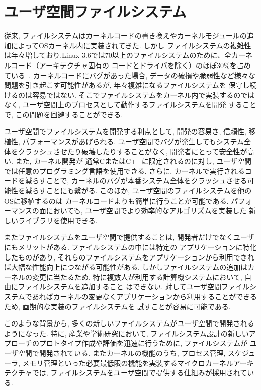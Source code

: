 \documentclass[a4paper,11pt]{jreport}
\begin{document}
\section{ユーザ空間ファイルシステム}
従来, ファイルシステムはカーネルコードの書き換えやカーネルモジュールの追加によってOSカーネル内に実装されてきた. しかし
ファイルシステムの複雑性は年々増しており,Linux 3.6では70以上のファイルシステムのために、全カーネルコード（アーキテクチャ固有の
コードとドライバを除く）のほぼ30\%を占めている~\cite{190583}.
カーネルコードにバグがあった場合, データの破損や脆弱性など様々な問題を引き起こす可能性があるが, 年々複雑になるファイルシステムを
保守し続けるのは容易ではない. 
そこでファイルシステムをカーネル内で実装するのではなく, ユーザ空間上のプロセスとして動作するファイルシステムを開発
することで, この問題を回避することができる. 

ユーザ空間でファイルシステムを開発する利点として, 開発の容易さ, 信頼性, 移植性, パフォーマンスがあげられる. 
ユーザ空間でバグが発生してもシステム全体をクラッシュさせたり破壊したりすることがなく, 開発者にとって安全性が高い. また, カーネル開発が
通常CまたはC++に限定されるのに対し, ユーザ空間では任意のプログラミング言語を使用できる. さらに, カーネルで実行されるコードを減らすことで, 
カーネルのバグが本番システム全体をクラッシュさせる可能性を減らすことにも繋がる. このほか, ユーザ空間のファイルシステムを他のOSに移植するのは
カーネルコードよりも簡単に行うことが可能である. パフォーマンスの面においても, ユーザ空間でより効率的なアルゴリズムを実装した
新しいライブラリを使用できる. 

またファイルシステムをユーザ空間で提供することは, 開発者だけでなくユーザにもメリットがある. ファイルシステムの中には特定の
アプリケーションに特化したものがあり, それらのファイルシステムをアプリケーションから利用できれば大幅な性能向上につながる可能性がある. 
しかしファイルシステムの追加はカーネルの変更に当たるため, 特に複数人が利用する計算機システムにおいて, 自由にファイルシステムを追加すること
はできない. 
対してユーザ空間ファイルシステムであればカーネルの変更なくアプリケーションから利用することができるため, 画期的な実装のファイルシステムを
試すことが容易に可能である. 

このような背景から, 多くの新しいファイルシステムがユーザ空間で開発されるようになった.
特に, 産業や学術研究において, ファイルシステム設計の新しいアプローチのプロトタイプ作成や評価を迅速に行うために, ファイルシステムが
ユーザ空間で開発されている. 
またカーネルの機能のうち, プロセス管理, スケジューラ, メモリ管理といった必要最低限の機能を実装するマイクロカーネルアーキテクチャでは, 
ファイルシステムをユーザ空間で提供する仕組みが採用されている. 
\end{document}
